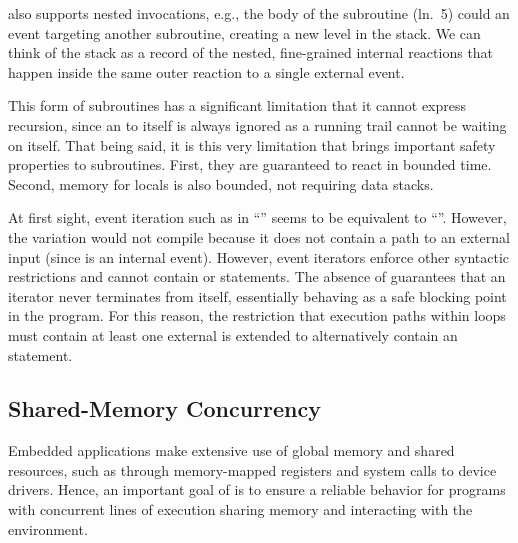 
\CEU also supports nested  invocations, e.g., the body of the
subroutine  (ln.~5) could  an event targeting another
subroutine, creating a new level in the stack.
%
We can think of the stack as a record of the nested, fine-grained internal
reactions that happen inside the same outer reaction to a single external
event.

This form of subroutines has a significant limitation that it cannot express
recursion, since an  to itself is always ignored as a running trail
cannot be waiting on itself.
%
That being said, it is this very limitation that brings important safety
properties to subroutines.
%
First, they are guaranteed to react in bounded time.
%
Second, memory for locals is also bounded, not requiring data stacks.

At first sight, event iteration such as in ``'' seems
to be equivalent to ``''.
However, the  variation would not compile because it does not
contain a path to an external input  (since  is an internal
event).
%
However, event iterators enforce other syntactic restrictions and cannot
contain  or  statements.
The absence of  guarantees that an iterator never terminates from
itself, essentially behaving as a safe blocking point in the program.
%
For this reason, the restriction that execution paths within loops must
contain at least one external  is extended to alternatively contain
an  statement.

\subsection{Shared-Memory Concurrency}
\label{sec.ceu.shared}

Embedded applications make extensive use of global memory and shared resources,
such as through memory-mapped registers and system calls to device drivers.
Hence, an important goal of \CEU is to ensure a reliable behavior for programs
with concurrent lines of execution sharing memory and interacting with the
environment.

